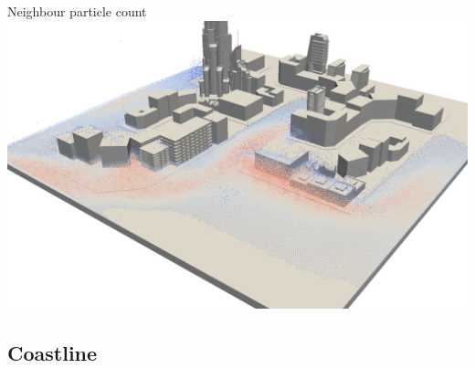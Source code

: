 \documentclass[8pt,sans,mathserif,aspectratio=43]{beamer}
\begin{document}

\begin{frame}{Neighbour particle count}
  \includegraphics[width=\textwidth]{figures/samples.png}
\end{frame}


\subsection{Coastline}
\end{document}
